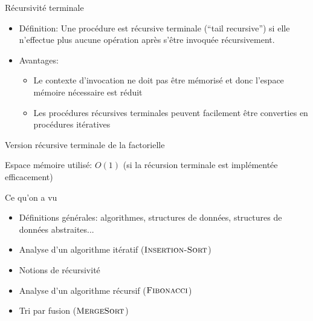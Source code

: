 \begin{frame}{Récursivité terminale}

\begin{itemize}
\item Définition: Une procédure est \alert{récursive terminale} (``tail recursive'') si elle n'effectue plus aucune opération après s'être invoquée récursivement.

\bigskip

\item Avantages:
\begin{itemize}
\item Le contexte d'invocation ne doit pas être mémorisé et donc l'espace mémoire nécessaire est réduit
\item Les procédures récursives terminales peuvent facilement être converties en procédures itératives
\end{itemize}
\end{itemize}

\end{frame}

\begin{frame}{Version récursive terminale de la factorielle}

\begin{center}
\end{center}

\begin{center}
\end{center}

\bigskip

Espace mémoire utilisé: $O(1)$ (si la récursion terminale est implémentée efficacement)


\end{frame}

\begin{frame}{Ce qu'on a vu}

\begin{itemize}
\item Définitions générales: algorithmes, structures de données, structures de données abstraites...
\item Analyse d'un algorithme itératif ($\textnormal{\scshape Insertion-Sort}$)
\item Notions de récursivité
\item Analyse d'un algorithme récursif ($\textnormal{\scshape Fibonacci}$)
\item Tri par fusion ($\textnormal{\scshape MergeSort}$)
\end{itemize}

\end{frame}
